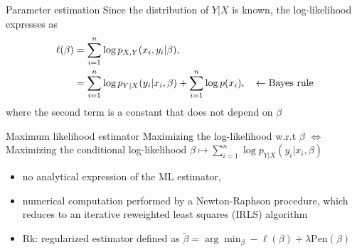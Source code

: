 \documentclass[compress, smaller, serif, 9pt]{beamer}
\begin{document}
\begin{frame}{Parameter estimation}
 Since the distribution of $Y|X$ is known, the log-likelihood expresses as \vspace{-2mm}
 \begin{align*}
  \ell(\beta)&= \sum_{i=1}^n \log{ p_{X,Y}(x_i,y_i|\beta)},\\
  &=  \sum_{i=1}^n \log{ p_{Y|X}(y_i|x_i,\beta)} + \sum_{i=1}^n \log{ p(x_i)}, \quad \leftarrow \textrm{Bayes rule}\vspace{-2mm}
 \end{align*}
 where the second term is a constant that does not depend on $\beta$
 
 
 \medskip
 \begin{block}{Maximum likelihood estimator}
 \medskip
 Maximizing the log-likelihood w.r.t $\beta$ $\Leftrightarrow$ Maximizing the conditional log-likelihood  
 $\beta \mapsto \sum_{i=1}^n \log{ p_{Y|X}(y_i|x_i,\beta)}$
\begin{itemize}
 \item no analytical expression of the ML estimator,
 \item numerical computation performed by a Newton-Raphson procedure, which reduces to an 
 iterative reweighted least squares (IRLS) algorithm
 \item Rk: regularized estimator defined as $\widetilde{\beta} = \arg \min_{\beta} -\ell(\beta) + \lambda \textrm{Pen}(\beta)$
\end{itemize}
\end{block}

\end{frame}
\end{document}
